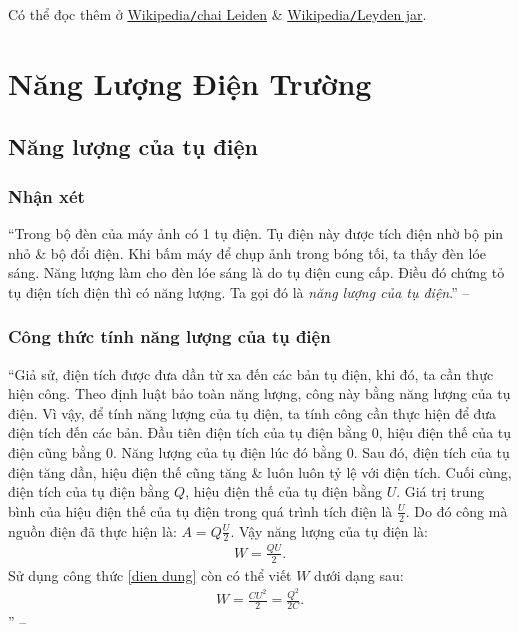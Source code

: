 \documentclass[oneside]{book}
\numberwithin{equation}{section}
\begin{document}
Có thể đọc thêm ở \href{https://vi.wikipedia.org/wiki/Chai_Leiden}{Wikipedia\texttt{/}chai Leiden} \& \href{https://en.wikipedia.org/wiki/Leyden_jar}{Wikipedia\texttt{/}Leyden jar}.



\section{Năng Lượng Điện Trường}

\subsection{Năng lượng của tụ điện}

\subsubsection{Nhận xét}
``Trong bộ đèn của máy ảnh có 1 tụ điện. Tụ điện này được tích điện nhờ bộ pin nhỏ \& bộ đổi điện. Khi bấm máy để chụp ảnh trong bóng tối, ta thấy đèn lóe sáng. Năng lượng làm cho đèn lóe sáng là do tụ điện cung cấp. Điều đó chứng tỏ tụ điện tích điện thì có năng lượng. Ta gọi đó là \textit{năng lượng của tụ điện}.'' -- \cite[p. 38]{SGK_Vat_Ly_11_nang_cao}

\subsubsection{Công thức tính năng lượng của tụ điện}
``Giả sử, điện tích được đưa dần từ xa đến các bản tụ điện, khi đó, ta cần thực hiện công. Theo định luật bảo toàn năng lượng, công này bằng năng lượng của tụ điện. Vì vậy, để tính năng lượng của tụ điện, ta tính công cần thực hiện để đưa điện tích đến các bản. Đầu tiên điện tích của tụ điện bằng 0, hiệu điện thế của tụ điện cũng bằng 0. Năng lượng của tụ điện lúc đó bằng 0. Sau đó, điện tích của tụ điện tăng dần, hiệu điện thế cũng tăng \& luôn luôn tỷ lệ với điện tích. Cuối cùng, điện tích của tụ điện bằng $Q$, hiệu điện thế của tụ điện bằng $U$. Giá trị trung bình của hiệu điện thế của tụ điện trong quá trình tích điện là $\frac{U}{2}$. Do đó công mà nguồn điện đã thực hiện là: $A = Q\frac{U}{2}$. Vậy năng lượng của tụ điện là:
\begin{align}
	\label{nang luong tu dien}
	W = \frac{QU}{2}.
\end{align}
Sử dụng công thức \eqref{dien dung} còn có thể viết $W$ dưới dạng sau:
\begin{align}
	\label{nang luong tu dien 1}
	W = \frac{CU^2}{2} = \frac{Q^2}{2C}.
\end{align}
'' -- \cite[p. 38]{SGK_Vat_Ly_11_nang_cao}
\end{document}
